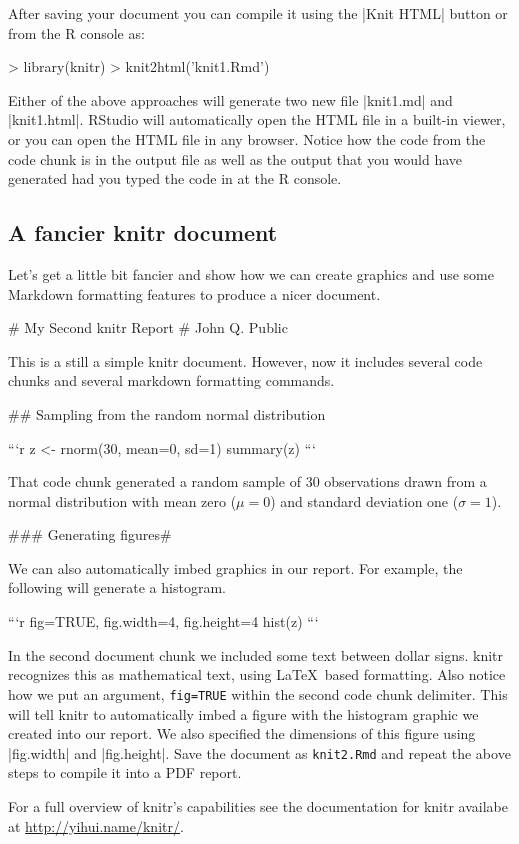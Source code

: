After saving your document you can compile it using the |Knit HTML| button or from the R console as:
\begin{R}
> library(knitr)
> knit2html('knit1.Rmd')
\end{R}
%
Either of the above approaches will generate two new file |knit1.md| and |knit1.html|. RStudio will automatically open the HTML file in a built-in viewer, or you can open the HTML file in any browser. Notice how the code from the code chunk is in the output file as well as the output that you would have generated had you typed the code in at the R console.


\subsection{A fancier knitr document}

Let's get a little bit fancier and show how we can create graphics and
use some Markdown formatting features to produce a nicer document.
%
\begin{codeblock}
# My Second knitr Report
# John Q. Public

This is a still a simple knitr document. However,
now it includes several code chunks and several
markdown formatting commands.

## Sampling from the random normal distribution

```{r}
z <- rnorm(30, mean=0, sd=1)
summary(z)
```

That code chunk generated a random sample of 30
observations drawn from a normal distribution with mean
zero ($\mu = 0$) and standard deviation one ($\sigma = 1$).


### Generating figures#

We can also automatically imbed graphics in our
report. For example, the following will generate
a histogram.

```{r fig=TRUE, fig.width=4, fig.height=4}
hist(z)
```
\end{codeblock}

In the second document chunk we included some text between dollar signs.  knitr recognizes this as mathematical text, using \LaTeX\ based formatting. Also notice how we put an argument, \lstinline!fig=TRUE! within the second
code chunk delimiter. This will tell knitr to automatically imbed a
figure with the histogram graphic we created into our report.  We also specified the dimensions of this figure using |fig.width| and |fig.height|.  Save the document
as \lstinline!knit2.Rmd! and repeat the above steps to compile it into
a PDF report.

For a full overview of knitr's capabilities see the documentation for
knitr availabe at
\url{http://yihui.name/knitr/}.

